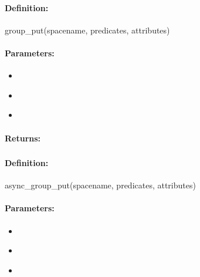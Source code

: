 \paragraph{Definition:}
\begin{rubycode}
group_put(spacename, predicates, attributes)
\end{rubycode}

\paragraph{Parameters:}
\begin{itemize}[noitemsep]
\item {}\\

\item {}\\

\item {}\\

\end{itemize}

\paragraph{Returns:}


\pagebreak
\subsubsection{}
\label{api:ruby:async_group_put}


\paragraph{Definition:}
\begin{rubycode}
async_group_put(spacename, predicates, attributes)
\end{rubycode}

\paragraph{Parameters:}
\begin{itemize}[noitemsep]
\item {}\\

\item {}\\

\item {}\\

\end{itemize}

